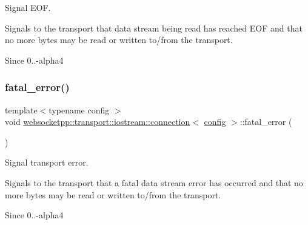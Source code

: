 Signal E\+OF. 

Signals to the transport that data stream being read has reached E\+OF and that no more bytes may be read or written to/from the transport.

\begin{DoxySince}{Since}
0..-\/alpha4 
\end{DoxySince}
\mbox{\label{classwebsocketpp_1_1transport_1_1iostream_1_1connection_a3fdd2b1f005daafa73bffe45063a7750}} 
\subsubsection{\texorpdfstring{fatal\+\_\+error()}{fatal\_error()}}
{\footnotesize\ttfamily template$<$typename config $>$ \\
void \mbox{\hyperlink{classwebsocketpp_1_1transport_1_1iostream_1_1connection}{websocketpp\+::transport\+::iostream\+::connection}}$<$ \mbox{\hyperlink{classconfig}{config}} $>$\+::fatal\+\_\+error (\begin{DoxyParamCaption}{ }\end{DoxyParamCaption})\hspace{0.3cm}{\ttfamily [inline]}}



Signal transport error. 

Signals to the transport that a fatal data stream error has occurred and that no more bytes may be read or written to/from the transport.

\begin{DoxySince}{Since}
0..-\/alpha4 
\end{DoxySince}
\mbox{\label{classwebsocketpp_1_1transport_1_1iostream_1_1connection_a06d23eee9c6c1bd1a48f7cf8a081bda9}} 
